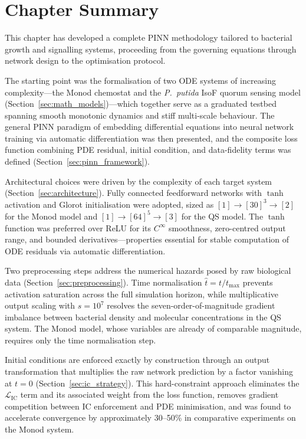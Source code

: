 \documentclass[14pt,a4paper,openany]{extbook}
\begin{document}
\section{Chapter Summary}
\label{sec:method_summary}

This chapter has developed a complete PINN methodology tailored to bacterial growth and signalling systems, proceeding from the governing equations through network design to the optimisation protocol.

The starting point was the formalisation of two ODE systems of increasing complexity---the Monod chemostat and the \textit{P.~putida} IsoF quorum sensing model (Section~\ref{sec:math_models})---which together serve as a graduated testbed spanning smooth monotonic dynamics and stiff multi-scale behaviour. The general PINN paradigm of embedding differential equations into neural network training via automatic differentiation was then presented, and the composite loss function combining PDE residual, initial condition, and data-fidelity terms was defined (Section~\ref{sec:pinn_framework}).

Architectural choices were driven by the complexity of each target system (Section~\ref{sec:architecture}). Fully connected feedforward networks with $\tanh$ activation and Glorot initialisation were adopted, sized as $[1] \to [30]^3 \to [2]$ for the Monod model and $[1] \to [64]^5 \to [3]$ for the QS model. The $\tanh$ function was preferred over ReLU for its $C^{\infty}$ smoothness, zero-centred output range, and bounded derivatives---properties essential for stable computation of ODE residuals via automatic differentiation.

Two preprocessing steps address the numerical hazards posed by raw biological data (Section~\ref{sec:preprocessing}). Time normalisation $\hat{t} = t / t_{\max}$ prevents activation saturation across the full simulation horizon, while multiplicative output scaling with $s = 10^{7}$ resolves the seven-order-of-magnitude gradient imbalance between bacterial density and molecular concentrations in the QS system. The Monod model, whose variables are already of comparable magnitude, requires only the time normalisation step.

Initial conditions are enforced exactly by construction through an output transformation that multiplies the raw network prediction by a factor vanishing at $t = 0$ (Section~\ref{sec:ic_strategy}). This hard-constraint approach eliminates the $\mathcal{L}_{\mathrm{IC}}$ term and its associated weight from the loss function, removes gradient competition between IC enforcement and PDE minimisation, and was found to accelerate convergence by approximately 30--50\% in comparative experiments on the Monod system.
\end{document}
